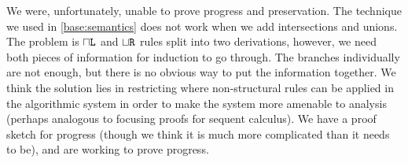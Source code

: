 We were, unfortunately, unable to prove progress and preservation. The technique we used in \cref{base:semantics} does not work when we add intersections and unions. The problem is $\mathbin{\sqcap}\texttt{L}$ and $\mathbin{\sqcup}\texttt{R}$ rules split into two derivations, however, we need both pieces of information for induction to go through. The branches individually are not enough, but there is no obvious way to put the information together. We think the solution lies in restricting where non-structural rules can be applied in the algorithmic system in order to make the system more amenable to analysis (perhaps analogous to focusing proofs for sequent calculus). We have a proof sketch for progress (though we think it is much more complicated than it needs to be), and are working to prove progress.

